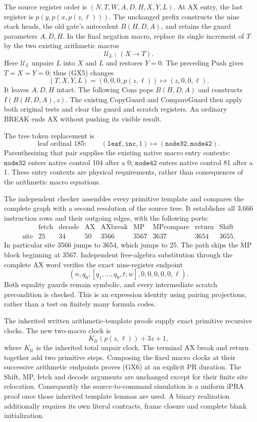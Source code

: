 The source register order is $(N,T,W,A,D,H,X,Y,L)$.
At AX entry, the last register is $p(y,p(x,p(z,\ell)))$.
The unchanged prefix constructs the nine stack heads, the old gate's
antecedent $B(H,D,A)$, and retains the guard parameters $A,D,H$.
In the final negation macro, replace its single increment of $T$ by
the two existing arithmetic macros
\[
             \mathcal U_L\ ;\ (X\longrightarrow T).     \tag{GX5}
\]
Here $\mathcal U_L$ unpairs $L$ into $X$ and $L$ and restores $Y=0$.
The preceding Push gives $T=X=Y=0$; thus (GX5) changes
\[
 (T,X,Y,L)=(0,0,0,p(z,\ell))
            \longmapsto(z,0,0,\ell).
\]
It leaves $A,D,H$ intact.  The following Cons pops $B(H,D,A)$ and
constructs $I(B(H,D,A),z)$.  The existing CopyGuard and CompareGuard
then apply both original tests and clear the guard and scratch registers.
An ordinary BREAK ends AX without pushing its visible result.

The tree token replacement is
\[
 \text{leaf ordinal }185:\qquad
  (\texttt{leaf},\texttt{inc},1)
      \longmapsto(\texttt{node32},\texttt{node42}).
\]
Parenthesizing that pair supplies the existing native macro entry contexts:
$\texttt{node32}$ enters native control 104 after a 0; $\texttt{node42}$
enters native control 81 after a 1.  These entry contexts are physical
requirements, rather than consequences of the arithmetic macro equations.

The independent checker  assembles every primitive
template and compares the complete graph with a second resolution of the
source tree.  It establishes all 3,666 instruction rows and their outgoing
edges, with the following ports:
\[
\begin{array}{c|rrrrrrrr}
 &\mathrm{fetch}&\mathrm{decode}&\mathrm{AX}&\mathrm{AXbreak}
 &\mathrm{MP}&\mathrm{MPcompare}&\mathrm{return}&\mathrm{Shift}\\\hline
 \mathrm{site}&25&34&50&3566&3567&3637&3654&3655.
\end{array}
\]
In particular site 3566 jumps to 3654, which jumps to 25.  The path skips
the MP block beginning at 3567.  Independent free-algebra substitution
through the complete AX word verifies the exact nine-register endpoint
\[
 (n,q_0,[q_1,\ldots,q_9,t;w],0,0,0,0,0,\ell).         \tag{GX6}
\]
Both equality guards remain symbolic, and every intermediate scratch
precondition is checked.  This is an expression identity using pairing
projections, rather than a test on finitely many formula codes.

The inherited written arithmetic-template proofs supply exact primitive
recursive clocks.  The new two-macro clock is
\[
           K_{\mathcal U}(p(z,\ell))+3z+1,
\]
where $K_{\mathcal U}$ is the inherited total unpair clock.  The terminal
AX break and return together add two primitive steps.  Composing the
fixed macro clocks at their successive arithmetic endpoints proves (GX6)
at an explicit PR duration.  The Shift, MP, fetch and decode arguments are
unchanged except for their finite site relocation.  Consequently the
source-to-command simulation is a uniform iPRA proof once those inherited
template lemmas are used.  A binary realization additionally requires its
own literal contracts, frame closure and complete blank initialization.

